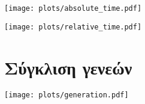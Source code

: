 \noindent
\begin{minipage}{\textwidth}
	\centering
	\texttt{[image: plots/absolute\_time.pdf]}
	\label{fig:absolute_time}
\end{minipage}

\noindent
\begin{minipage}{\textwidth}
	\centering
	\texttt{[image: plots/relative\_time.pdf]}
	\label{fig:relative_time}
\end{minipage}

\noindent
\begin{minipage}{\textwidth}
	\section{Σύγκλιση γενεών}
	\centering
	\texttt{[image: plots/generation.pdf]}
	\label{fig:generation}
\end{minipage}
